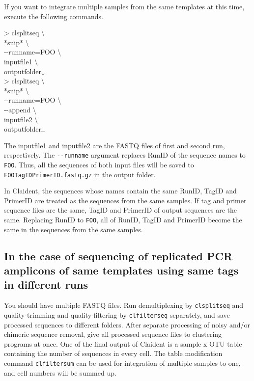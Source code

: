 \documentclass[titlepage,10pt,a4paper,english]{jsbook}
\newenvironment{cmd}{\begin{oframed}\raggedright\ttfamily\footnotesize\setlength{\baselineskip}{1.4em}}{\end{oframed}\vspace{-1em}}
\begin{document}
If you want to integrate multiple samples from the same templates at this time, execute the following commands.
\begin{cmd}
{\textgreater} clsplitseq {\textbackslash}\\
*snip* {\textbackslash}\\
{-}{-}runname=FOO {\textbackslash}\\
inputfile1 {\textbackslash}\\
outputfolder↓\\
{\textgreater} clsplitseq {\textbackslash}\\
*snip* {\textbackslash}\\
{-}{-}runname=FOO {\textbackslash}\\
{-}{-}append {\textbackslash}\\
inputfile2 {\textbackslash}\\
outputfolder↓
\end{cmd}
The inputfile1 and inputfile2 are the FASTQ files of first and second run, respectively.
The \texttt{{-}{-}runname} argument replaces RunID of the sequence names to \texttt{FOO}.
Thus, all the sequences of both input files will be saved to \texttt{FOO{\textunderscore}{\textunderscore}TagID{\textunderscore}{\textunderscore}PrimerID.fastq.gz} in the output folder.

In Claident, the sequences whose names contain the same RunID, TagID and PrimerID are treated as the sequences from the same samples.
If tag and primer sequence files are the same, TagID and PrimerID of output sequences are the same.
Replacing RunID to \texttt{FOO}, all of RunID, TagID and PrimerID become the same in the sequences from the same samples.

\subsection{In the case of sequencing of replicated PCR amplicons of same templates using same tags in different runs}

You should have multiple FASTQ files.
Run demultiplexing by \texttt{clsplitseq} and quality-trimming and quality-filtering by \texttt{clfilterseq} separately, and save processed sequences to different folders.
After separate processing of noisy and/or chimeric sequence removal, give all processed sequence files to clustering programs at once.
One of the final output of Claident is a sample x OTU table containing the number of sequences in every cell.
The table modification command \texttt{clfiltersum} can be used for integration of multiple samples to one, and cell numbers will be summed up.
\end{document}
